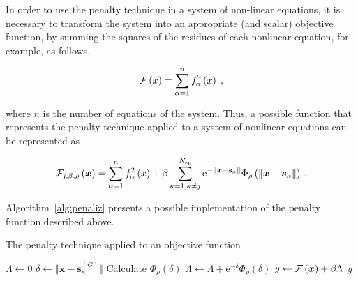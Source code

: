 \documentclass[smallextended]{svjour3}       %
\begin{document}
In order to use the penalty technique in a system of non-linear equations, it is necessary to transform the system into an appropriate (and scalar) objective function, by summing the squares of the residues of each nonlinear equation, for example, as follows, 

\begin{equation} \label{eq:modelo_fitness}
{\cal{F}}\left(x\right) = \sum\limits_{\alpha = 1}^{n} f_{\alpha}^{2}\left(x\right) \; ,
\end{equation}

\noindent where $ n $ is the number of equations of the system. Thus, a possible function that represents the penalty technique applied to a system of nonlinear equations can be represented as

\begin{equation} \label{eq:funcao_penaliz_sist}
{\cal{F}}_{j, \beta, \rho}\left(\boldsymbol{x}\right) = \sum\limits_{\alpha = 1}^{n} f_{\alpha}^{2}\left(x\right) + \beta\sum\limits_{\kappa=1, \kappa\neq j}^{N_{\text{sp}}}\text{e}^{-\Vert \boldsymbol{x} - \boldsymbol{s}_{\kappa} \Vert}\Phi_{\rho}\left(\Vert \boldsymbol{x} - \boldsymbol{s}_{\kappa} \Vert\right) \: .
\end{equation}

Algorithm~\ref{alg:penaliz} presents a possible implementation of the penalty function described above.

\begin{algorithm}[!htb]
\caption{The penalty technique applied to an objective function}\label{alg:penaliz}
\begin{algorithmic}[1]
\State $ \Lambda \leftarrow 0 $
\State $ \delta \leftarrow \Vert \boldsymbol{x} - \boldsymbol{s}_{\kappa} ^{(G)} \Vert $
\State Calculate $ \Phi_{\rho}\left(\delta\right) $
\State $ \Lambda \leftarrow \Lambda + \text{e}^{-\delta}\Phi_{\rho}\left(\delta\right) $
\EndFor
\State $ y \leftarrow {\cal{F}}\left(\boldsymbol{x}\right) + \beta\Lambda $
\State \Return $ y $
\EndFunction
\end{algorithmic}
\end{algorithm}
\end{document}
